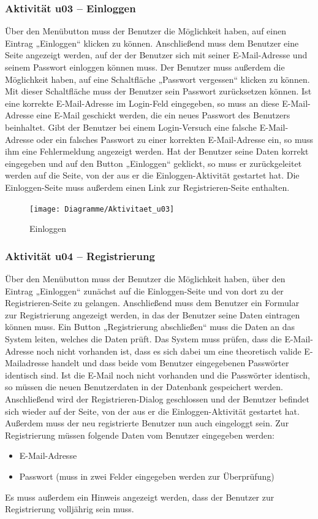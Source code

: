 \documentclass[a4paper,12pt,oneside]{scrartcl}
\begin{document}
\subsubsection{Aktivität u03 – Einloggen}
Über den Menübutton muss der Benutzer die Möglichkeit haben, auf einen Eintrag „Einloggen“ klicken zu können.
Anschließend muss dem Benutzer eine Seite angezeigt werden, auf der der Benutzer sich mit seiner E-Mail-Adresse und seinem Passwort einloggen können muss.
Der Benutzer muss außerdem die Möglichkeit haben, auf eine Schaltfläche „Passwort vergessen“ klicken zu können. Mit dieser Schaltfläche muss der Benutzer sein Passwort zurücksetzen können.
Ist eine korrekte E-Mail-Adresse im Login-Feld eingegeben, so muss an diese E-Mail-Adresse eine E-Mail geschickt werden, die ein neues Passwort des Benutzers beinhaltet.
Gibt der Benutzer bei einem Login-Versuch eine falsche E-Mail-Adresse oder ein falsches Passwort zu einer korrekten E-Mail-Adresse ein, so muss ihm eine Fehlermeldung angezeigt werden.
Hat der Benutzer seine Daten korrekt eingegeben und auf den Button „Einloggen“ geklickt, so muss er zurückgeleitet werden auf die Seite, von der aus er die Einloggen-Aktivität gestartet hat.
Die Einloggen-Seite muss außerdem einen Link zur Registrieren-Seite enthalten.

\begin{figure}[!htbp]
\centering
\noindent\texttt{[image: Diagramme/Aktivitaet\_u03]}
\caption{Einloggen}
\end{figure}
\FloatBarrier


\subsubsection{Aktivität u04 – Registrierung}
Über den Menübutton muss der Benutzer die Möglichkeit haben, über den Eintrag „Einloggen“ zunächst auf die Einloggen-Seite und von dort zu der Registrieren-Seite zu gelangen.
Anschließend muss dem Benutzer ein Formular zur Registrierung angezeigt werden, in das der Benutzer seine Daten eintragen können muss.
Ein Button „Registrierung abschließen“ muss die Daten an das System leiten, welches die Daten prüft.
Das System muss prüfen, dass die E-Mail-Adresse noch nicht vorhanden ist, dass es sich dabei um eine theoretisch valide E-Mailadresse handelt und dass beide vom Benutzer eingegebenen Passwörter identisch sind.
Ist die E-Mail noch nicht vorhanden und die Passwörter identisch, so müssen die neuen Benutzerdaten in der Datenbank gespeichert werden. Anschließend wird der Registrieren-Dialog geschlossen und der Benutzer befindet sich wieder auf der Seite, von der aus er die Einloggen-Aktivität gestartet hat.
Außerdem muss der neu registrierte Benutzer nun auch eingeloggt sein.
Zur Registrierung müssen folgende Daten vom Benutzer eingegeben werden:
\begin{itemize}
	\item E-Mail-Adresse
	\item Passwort (muss in zwei Felder eingegeben werden zur Überprüfung)
\end{itemize}
Es muss außerdem ein Hinweis angezeigt werden, dass der Benutzer zur Registrierung volljährig sein muss.
\end{document}
